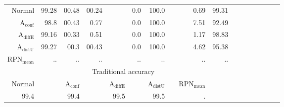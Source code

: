\begin{table}[ht]
\begin{tiny}
\begin{tabular}{@{}rrrrrrrcrrrrcrrrr@{}}
		Normal & 99.28 & 00.48 & 00.24 & & 0.0 & 100.0 && 0.69 & 99.31 \\
		$\mathrm{A}_{\mathrm{conf}}$ & 98.8 & 00.43 & 0.77 && 0.0 & 100.0 && 7.51 & 92.49 \\
		$\mathrm{A}_{\mathrm{diffE}}$ & 99.16 & 00.33 & 0.51 & & 0.0 & 100.0 & & 1.17 & 98.83 \\  
		$\mathrm{A}_{\mathrm{distU}}$ & 99.27 & 00.3 & 00.43 & & 0.0 & 100.0 & & 4.62 & 95.38 \\
		$\mathrm{RPN}_{\mathrm{mean}}$ & .. & .. & .. & & .. & .. & & .. & .. \\
		\midrule
		\toprule
		& \multicolumn{8}{c}{Traditional accuracy} \\
		Normal & & $\mathrm{A}_{\mathrm{conf}}$ & & $\mathrm{A}_{\mathrm{diffE}}$ & & $\mathrm{A}_{\mathrm{distU}}$ & & $\mathrm{RPN}_{\mathrm{mean}}$ \\
		99.4 & & 99.4 & & 99.5 & & 99.5 & & . \\

        \end{tabular}
	\end{tiny}
	\label{tab:precision based data analysis}
\end{table}


